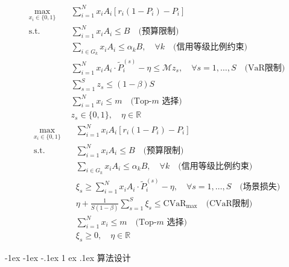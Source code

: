 \documentclass[12pt,nonblindrev]{write_paper}
\makeatletter
\renewcommand\section{\@startsection {section}{1}{\z@}%
                                   {-1ex \@plus -1ex \@minus -.1ex}%
                                   {1 ex \@plus.1ex}%
                                   {\normalfont\large\bfseries}}
\makeatother
\begin{document}
\begin{equation}
\begin{aligned}
\max_{x_i \in \{0,1\}} \quad & \sum_{i=1}^N x_i A_i \left[ r_i(1 - P_i) - P_i \right] \\
\text{s.t.} \quad
& \sum_{i=1}^N x_i A_i \le B \quad \text{(预算限制)} \\
& \sum_{i \in G_k} x_i A_i \le \alpha_k B, \quad \forall k \quad \text{(信用等级比例约束)} \\
& \sum_{i=1}^N x_i A_i \cdot \tilde{P}_i^{(s)} - \eta \le \mathcal{M} z_s, \quad \forall s=1,\dots,S \quad \text{(VaR限制)} \\
& \sum_{s=1}^S z_s \le (1 - \beta) S \\
& \sum_{i=1}^N x_i \le m \quad \text{(Top-$m$ 选择)} \\
& z_s \in \{0,1\}, \quad \eta \in \mathbb{R}
\end{aligned}
\label{eq:var_model}
\end{equation}
\begin{equation}
\begin{aligned}
\max_{x_i \in \{0,1\}} \quad & \sum_{i=1}^N x_i A_i \left[ r_i(1 - P_i) - P_i \right] \\
\text{s.t.} \quad
& \sum_{i=1}^N x_i A_i \le B \quad \text{(预算限制)} \\
& \sum_{i \in G_k} x_i A_i \le \alpha_k B, \quad \forall k \quad \text{(信用等级比例约束)} \\
& \xi_s \ge \sum_{i=1}^N x_i A_i \cdot \tilde{P}_i^{(s)} - \eta, \quad \forall s = 1,\dots,S \quad \text{(场景损失)} \\
& \eta + \frac{1}{S(1 - \beta)} \sum_{s=1}^S \xi_s \le \text{CVaR}_{\max} \quad \text{(CVaR限制)} \\
& \sum_{i=1}^N x_i \le m \quad \text{(Top-$m$ 选择)} \\
& \xi_s \ge 0, \quad \eta \in \mathbb{R}
\end{aligned}
\label{eq:cvar_model}
\end{equation}

\section{算法设计}
\end{document}
